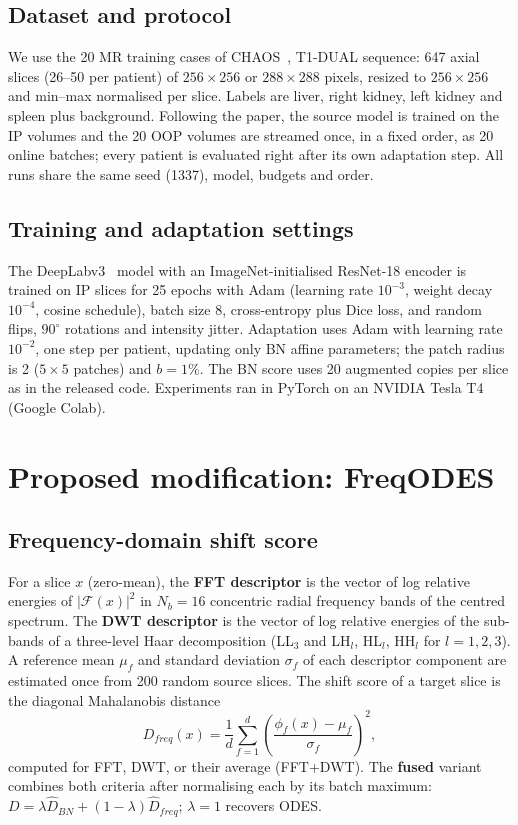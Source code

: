 \documentclass[a4paper,fleqn]{cas-sc}
\begin{document}
\subsection{Dataset and protocol}
We use the 20 MR training cases of CHAOS~\cite{kavur2021chaos}, T1-DUAL sequence: 647 axial slices (26--50 per patient) of $256\times256$ or $288\times288$ pixels, resized to $256\times256$ and min--max normalised per slice. Labels are liver, right kidney, left kidney and spleen plus background. Following the paper, the source model is trained on the IP volumes and the 20 OOP volumes are streamed once, in a fixed order, as 20 online batches; every patient is evaluated right after its own adaptation step. All runs share the same seed (1337), model, budgets and order.

\subsection{Training and adaptation settings}
The DeepLabv3~\cite{chen2017deeplab} model with an ImageNet-initialised ResNet-18 encoder is trained on IP slices for 25 epochs with Adam (learning rate $10^{-3}$, weight decay $10^{-4}$, cosine schedule), batch size 8, cross-entropy plus Dice loss, and random flips, $90^\circ$ rotations and intensity jitter. Adaptation uses Adam with learning rate $10^{-2}$, one step per patient, updating only BN affine parameters; the patch radius is 2 ($5\times5$ patches) and $b=1\%$. The BN score uses 20 augmented copies per slice as in the released code. Experiments ran in PyTorch on an NVIDIA Tesla T4 (Google Colab).

\section{Proposed modification: FreqODES}
\subsection{Frequency-domain shift score}
For a slice $x$ (zero-mean), the \textbf{FFT descriptor} is the vector of log relative energies of $|\mathcal{F}(x)|^2$ in $N_b=16$ concentric radial frequency bands of the centred spectrum. The \textbf{DWT descriptor} is the vector of log relative energies of the sub-bands of a three-level Haar decomposition (LL$_3$ and LH$_l$, HL$_l$, HH$_l$ for $l=1,2,3$). A reference mean $\mu_f$ and standard deviation $\sigma_f$ of each descriptor component are estimated once from 200 random source slices. The shift score of a target slice is the diagonal Mahalanobis distance
\begin{equation}
D_{freq}(x)=\frac{1}{d}\sum_{f=1}^{d}\left(\frac{\phi_f(x)-\mu_f}{\sigma_f}\right)^2 ,
\end{equation}
computed for FFT, DWT, or their average (FFT+DWT). The \textbf{fused} variant combines both criteria after normalising each by its batch maximum: $D=\lambda\hat D_{BN}+(1-\lambda)\hat D_{freq}$; $\lambda=1$ recovers ODES.
\end{document}
